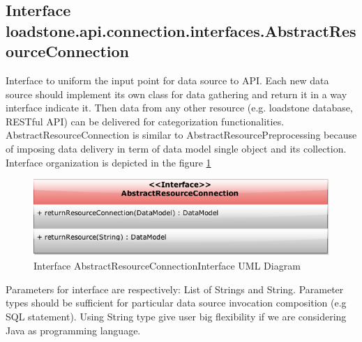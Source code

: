 \subsection{Interface \newline loadstone.api.connection.interfaces.AbstractResourceConnection}
Interface to uniform the input point for data source to API. Each new data source should implement its own class for data gathering and return it in a way interface indicate it. Then data from any other resource (e.g. loadstone database, RESTful API) can be delivered for categorization functionalities. AbstractResourceConnection is similar to AbstractResourcePreprocessing because of imposing data delivery in term of data model single object and its collection. Interface organization is depicted in the figure \ref{fig:@=connection}   
\begin{figure}[h]
	\centering
	\includegraphics[scale=0.5]{Abstract_Resource_Connection_Interface.png}
	\caption{Interface AbstractResourceConnectionInterface UML Diagram}
	\label{fig:@=connection}
\end{figure}
Parameters for interface are respectively: List of Strings and String. Parameter types should be sufficient for particular data source invocation composition (e.g SQL statement). Using String type give user big flexibility if we are considering Java as programming language.
